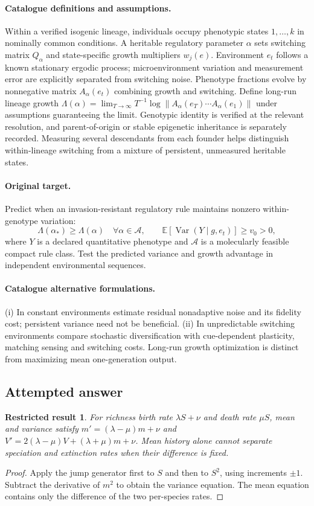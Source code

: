 \documentclass[11pt]{article}
\newcommand{\E}{\mathbb E}
\DeclareMathOperator{\Var}{Var}
\providecommand{\E}{\mathbb E}
\providecommand{\Var}{\operatorname{Var}}
\newtheorem{attemptresult}{Restricted result}[section]
\begin{document}
\paragraph{Catalogue definitions and assumptions.}
Within a verified isogenic lineage, individuals occupy phenotypic states $1,\ldots,k$ in nominally common conditions. A heritable regulatory parameter $\alpha$ sets switching matrix $Q_\alpha$ and state-specific growth multipliers $w_j(e)$. Environment $e_t$ follows a known stationary ergodic process; microenvironment variation and measurement error are explicitly separated from switching noise. Phenotype fractions evolve by nonnegative matrix $A_\alpha(e_t)$ combining growth and switching. Define long-run lineage growth $\Lambda(\alpha)=\lim_{T\to\infty}T^{-1}\log\|A_\alpha(e_T)\cdots A_\alpha(e_1)\|$ under assumptions guaranteeing the limit. Genotypic identity is verified at the relevant resolution, and parent-of-origin or stable epigenetic inheritance is separately recorded. Measuring several descendants from each founder helps distinguish within-lineage switching from a mixture of persistent, unmeasured heritable states.
\paragraph{Original target.}
Predict when an invasion-resistant regulatory rule maintains nonzero within-genotype variation:
\[
 \Lambda(\alpha_*)\ge\Lambda(\alpha)\quad\forall\alpha\in\mathcal A,
 \qquad \E[\Var(Y\mid g,e_t)]\ge v_0>0,
\]
where $Y$ is a declared quantitative phenotype and $\mathcal A$ is a molecularly feasible compact rule class. Test the predicted variance and growth advantage in independent environmental sequences.
\paragraph{Catalogue alternative formulations.}
(i) In constant environments estimate residual nonadaptive noise and its fidelity cost; persistent variance need not be beneficial. (ii) In unpredictable switching environments compare stochastic diversification with cue-dependent plasticity, matching sensing and switching costs. Long-run growth optimization is distinct from maximizing mean one-generation output.
\subsection{Attempted answer}
\begin{attemptresult}
For richness birth rate $\lambda S+\nu$ and death rate $\mu S$, mean and variance satisfy $m\prime=(\lambda-\mu)m+\nu$ and $V\prime=2(\lambda-\mu)V+(\lambda+\mu)m+\nu$. Mean history alone cannot separate speciation and extinction rates when their difference is fixed.
\end{attemptresult}
\begin{proof}
Apply the jump generator first to $S$ and then to $S^2$, using increments $\pm1$. Subtract the derivative of $m^2$ to obtain the variance equation. The mean equation contains only the difference of the two per-species rates.
\end{proof}
\end{document}
